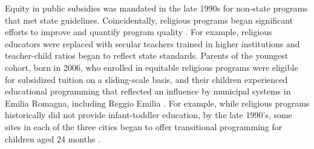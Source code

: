 Equity in public subsidies was mandated in the late 1990s for non-state programs that met state guidelines. Coincidentally, religious programs began significant efforts to improve and quantify program quality \citep{Malizia-Cicatelli_2011_BOOK_Catholic-School}. For example, religious educators were replaced with secular teachers trained in higher institutions and teacher-child ratios began to reflect state standards. Parents of the youngest cohort, born in 2006, who enrolled in equitable religious programs were eligible for subsidized tuition on a sliding-scale basis, and their children experienced educational programming that reflected an influence by municipal systems in Emilia Romagna, including Reggio Emilia \citep{Hohnerlein_2009_Paradox-Public-Preschools,OECD_2001_Italy-Country-Note}. For example, while religious programs historically did not provide infant-toddler education, by the late 1990's, some sites in each of the three cities began to offer transitional programming for children aged 24 months \citep{Malizia-Cicatelli_2011_BOOK_Catholic-School,CEHD_2016_Historical-Analysis}. 

